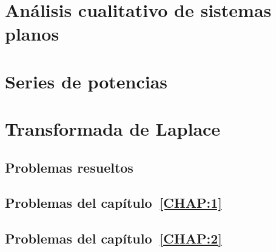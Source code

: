 \documentclass[a4paper, 10pt, openany]{book}
\begin{document}
\chapter{Análisis cualitativo de sistemas planos}
\label{CHAP:4}


\chapter{Series de potencias}
\label{CHAP:5}


\chapter{Transformada de Laplace}
\label{CHAP:6}


\begin{appendices}

\chapter{Problemas resueltos}

\section{Problemas del capítulo~\ref{CHAP:1}}


\section{Problemas del capítulo~\ref{CHAP:2}}


\end{appendices}

\backmatter

\listoffigures
{}

\listoftables
{}
\end{document}
